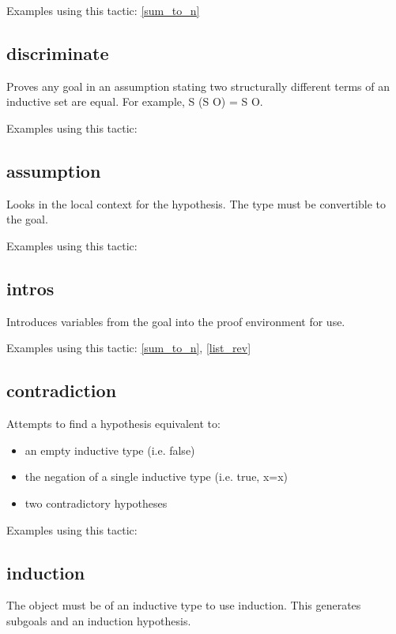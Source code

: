 \noindent
Examples using this tactic: 
\ref{sum_to_n}


\subsection{discriminate} \label{discriminate}
Proves any goal in an assumption stating two structurally different terms of an inductive set are equal. For example, S (S O) = S O.

\noindent
Examples using this tactic: 



\subsection{assumption} \label{assumption}
Looks in the local context for the hypothesis. The type must be convertible to the goal.

\noindent
Examples using this tactic: 



\subsection{intros} \label{intros}
Introduces variables from the goal into the proof environment for use.

\noindent
Examples using this tactic: 
\ref{sum_to_n}, \ref{list_rev}


\subsection{contradiction} \label{contradiction}
Attempts to find a hypothesis equivalent to:
\begin{itemize}
	\item an empty inductive type (i.e. false)
	\item the negation of a single inductive type (i.e. true, x=x)
	\item two contradictory hypotheses
\end{itemize}

\noindent
Examples using this tactic: 



\subsection{induction} \label{induction}
The object must be of an inductive type to use induction. 
This generates subgoals and an induction hypothesis.

